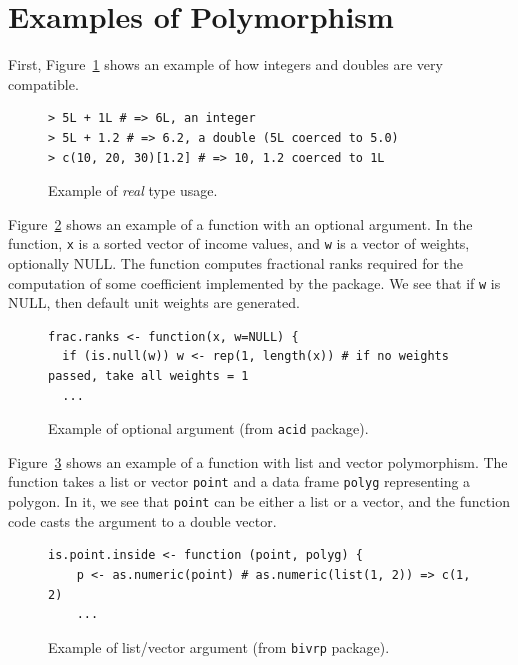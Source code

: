 \documentclass[acmsmall,10pt,review,anonymous]{acmart}\settopmatter{printfolios=true,printccs=false,printacmref=false}
\begin{document}
%
%
%
%
%
%
\section{Examples of Polymorphism}
\label{sec:polyex}


First, Figure~\ref{fig:realex} shows an example of how integers and doubles are very compatible.

\begin{figure}[!hb]{\small\begin{lstlisting}[style=R]
> 5L + 1L # => 6L, an integer
> 5L + 1.2 # => 6.2, a double (5L coerced to 5.0)
> c(10, 20, 30)[1.2] # => 10, 1.2 coerced to 1L
\end{lstlisting}}\caption{Example of {\it real} type usage.}\label{fig:realex}\end{figure}

Figure~\ref{fig:optnull} shows an example of a function with an optional argument.
In the function, {\tt x} is a sorted vector of income values, and {\tt w} is a vector of weights, optionally NULL.
The function computes fractional ranks required for the computation of some coefficient implemented by the package.
We see that if {\tt w} is NULL, then default unit weights are generated.

\begin{figure}[!hb]{\small\begin{lstlisting}[style=R]
frac.ranks <- function(x, w=NULL) {
  if (is.null(w)) w <- rep(1, length(x)) # if no weights passed, take all weights = 1
  ...
\end{lstlisting}}\caption{Example of optional argument (from {\tt acid} package).}\label{fig:optnull}\end{figure}

Figure~\ref{fig:listvec} shows an example of a function with list and vector polymorphism.
The function takes a list or vector {\tt point} and a data frame {\tt polyg} representing a polygon.
In it, we see that {\tt point} can be either a list or a vector, and the function code casts the argument to a double vector.

\begin{figure}[!hb]{\small\begin{lstlisting}[style=R]
is.point.inside <- function (point, polyg) {
    p <- as.numeric(point) # as.numeric(list(1, 2)) => c(1, 2)
    ...
\end{lstlisting}}\caption{Example of list/vector argument (from {\tt bivrp} package).}\label{fig:listvec}\end{figure}
\end{document}
